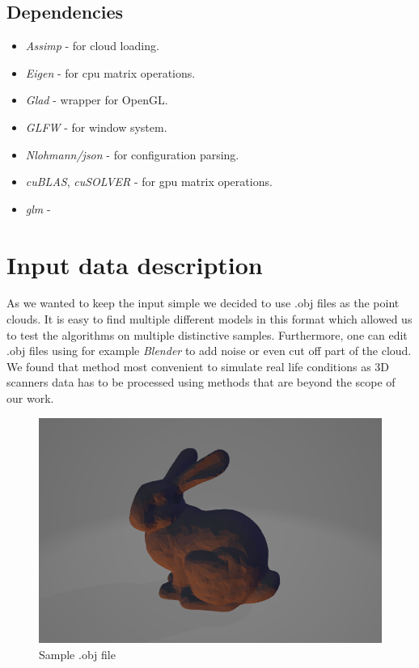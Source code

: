 \documentclass[titlepage]{article}
\begin{document}
\subsection{Dependencies}
\begin{itemize}
\item \textit{Assimp} - for cloud loading.
\item \textit{Eigen} - for cpu matrix operations.
\item \textit{Glad} - wrapper for OpenGL.
\item \textit{GLFW} - for window system.
\item \textit{Nlohmann/json} - for configuration parsing.
\item \textit{cuBLAS}, \textit{cuSOLVER} - for gpu matrix operations.
\item \textit{glm} - 
\end{itemize}

\section{Input data description}

As we wanted to keep the input simple we decided to use .obj files as the point clouds. It is easy to find multiple different models in this format which allowed us to test the algorithms on multiple distinctive samples. Furthermore, one can edit .obj files using for example \textit{Blender} to add noise or even cut off part of the cloud. We found that method most convenient to simulate real life conditions as 3D scanners data has to be processed using methods that are beyond the scope of our work.

\begin{figure}[H]
\includegraphics[width=\textwidth]{ms-bunny.png}
\caption{Sample .obj file}
\end{figure}
\end{document}
